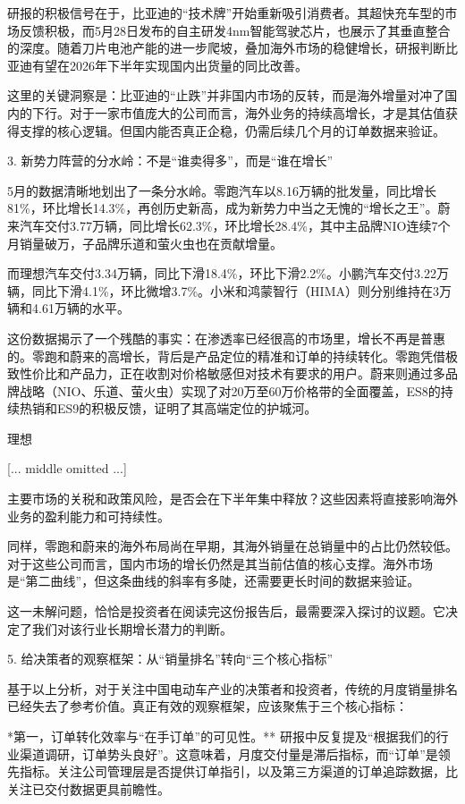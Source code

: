 \documentclass[11pt]{ctexart}
\begin{document}
研报的积极信号在于，比亚迪的“技术牌”开始重新吸引消费者。其超快充车型的市场反馈积极，而5月28日发布的自主研发4nm智能驾驶芯片，也展示了其垂直整合的深度。随着刀片电池产能的进一步爬坡，叠加海外市场的稳健增长，研报判断比亚迪有望在2026年下半年实现国内出货量的同比改善。

这里的关键洞察是：比亚迪的“止跌”并非国内市场的反转，而是海外增量对冲了国内的下行。对于一家市值庞大的公司而言，海外业务的持续高增长，才是其估值获得支撑的核心逻辑。但国内能否真正企稳，仍需后续几个月的订单数据来验证。

3. 新势力阵营的分水岭：不是“谁卖得多”，而是“谁在增长”

5月的数据清晰地划出了一条分水岭。零跑汽车以8.16万辆的批发量，同比增长81\%，环比增长14.3\%，再创历史新高，成为新势力中当之无愧的“增长之王”。蔚来汽车交付3.77万辆，同比增长62.3\%，环比增长28.4\%，其中主品牌NIO连续7个月销量破万，子品牌乐道和萤火虫也在贡献增量。

而理想汽车交付3.34万辆，同比下滑18.4\%，环比下滑2.2\%。小鹏汽车交付3.22万辆，同比下滑4.1\%，环比微增3.7\%。小米和鸿蒙智行（HIMA）则分别维持在3万辆和4.61万辆的水平。

这份数据揭示了一个残酷的事实：在渗透率已经很高的市场里，增长不再是普惠的。零跑和蔚来的高增长，背后是产品定位的精准和订单的持续转化。零跑凭借极致性价比和产品力，正在收割对价格敏感但对技术有要求的用户。蔚来则通过多品牌战略（NIO、乐道、萤火虫）实现了对20万至60万价格带的全面覆盖，ES8的持续热销和ES9的积极反馈，证明了其高端定位的护城河。

理想

[... middle omitted ...]

主要市场的关税和政策风险，是否会在下半年集中释放？这些因素将直接影响海外业务的盈利能力和可持续性。

同样，零跑和蔚来的海外布局尚在早期，其海外销量在总销量中的占比仍然较低。对于这些公司而言，国内市场的增长仍然是其当前估值的核心支撑。海外市场是“第二曲线”，但这条曲线的斜率有多陡，还需要更长时间的数据来验证。

这一未解问题，恰恰是投资者在阅读完这份报告后，最需要深入探讨的议题。它决定了我们对该行业长期增长潜力的判断。

5. 给决策者的观察框架：从“销量排名”转向“三个核心指标”

基于以上分析，对于关注中国电动车产业的决策者和投资者，传统的月度销量排名已经失去了参考价值。真正有效的观察框架，应该聚焦于三个核心指标：

*第一，订单转化效率与“在手订单”的可见性。** 研报中反复提及“根据我们的行业渠道调研，订单势头良好”。这意味着，月度交付量是滞后指标，而“订单”是领先指标。关注公司管理层是否提供订单指引，以及第三方渠道的订单追踪数据，比关注已交付数据更具前瞻性。
\end{document}
